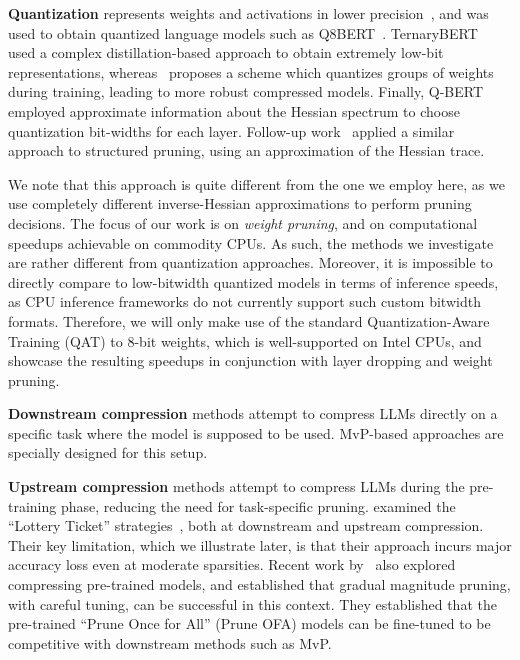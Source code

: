 \documentclass[11pt]{article}
\begin{document}
\noindent\textbf{Quantization} represents weights and activations in lower precision~\cite{Courbariaux2016BinarizedNN}, and was used to obtain quantized language models such as Q8BERT~\cite{Zafrir2019Q8BERTQ8}. TernaryBERT~\cite{zhang2020ternarybert} used a complex distillation-based approach to obtain extremely low-bit representations, whereas~\citet{fan2020training} proposes a scheme which quantizes groups of weights during training, leading to more robust compressed models. 
Finally, Q-BERT~\cite{shen2020q} employed approximate information about the Hessian spectrum to choose quantization bit-widths for each layer. Follow-up work~\cite{yu2022hessian} applied a similar approach to structured pruning, using an approximation of the Hessian trace. 

We note that this approach is quite different from the one we employ here, as we use completely different inverse-Hessian approximations to perform pruning decisions. The focus of our work is on \emph{weight pruning}, and on computational speedups achievable on commodity CPUs. 
As such, the methods we investigate are rather different from quantization approaches. Moreover, it is impossible to directly compare to low-bitwidth quantized models in terms of inference speeds, as CPU inference frameworks do not currently support such custom bitwidth formats. Therefore, we will only make use of the standard Quantization-Aware Training (QAT) to 8-bit weights, which is well-supported on Intel CPUs, and showcase the resulting speedups in conjunction with layer dropping and weight pruning. 

\noindent\textbf{Downstream compression} methods attempt to compress LLMs directly on a specific task where the model is supposed to be used. MvP-based approaches are specially designed for this setup.

\noindent\textbf{Upstream compression} methods attempt to compress LLMs during the pre-training phase, reducing the need for task-specific pruning. \citet{Chen2020TheLT} examined the ``Lottery Ticket'' strategies~\cite{Frankle2019TheLT}, both at downstream and upstream compression. Their key limitation, which we illustrate later, is that their approach incurs major accuracy loss even at moderate sparsities. Recent work by~\citet{zafrir2021prune} also explored compressing pre-trained models, and established that gradual magnitude pruning, with careful tuning, can be successful in this context. They established that the pre-trained ``Prune Once for All'' (Prune OFA) models can be fine-tuned to be competitive with downstream methods such as MvP.    
\end{document}
